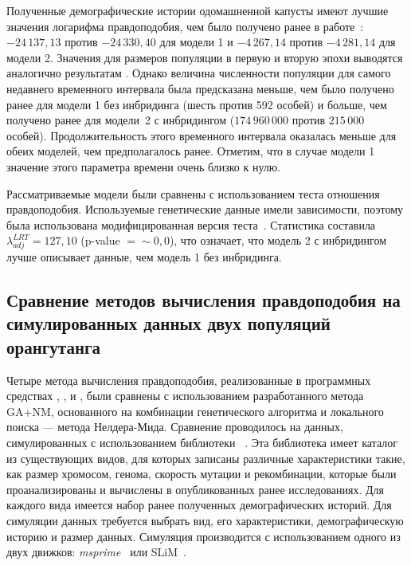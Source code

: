 Полученные демографические истории одомашненной капусты имеют лучшие значения логарифма правдоподобия, чем было получено ранее в работе~\cite{blischak2020inferring}: $-24{\,}137{,}13$ против $-24{\,}330{,}40$ для модели 1 и $-4{\,}267{,}14$ против $-4{\,}281{,}14$ для модели 2.
Значения для размеров популяции в первую и вторую эпохи выводятся аналогично результатам \cite{blischak2020inferring}.
Однако величина численности популяции для самого недавнего временного интервала была предсказана меньше, чем было получено ранее для модели 1 без инбридинга (шесть против 592 особей) и больше, чем получено ранее для модели~2 с инбридингом ($174{\,}960{\,}000$ против $215{\,}000$ особей).
Продолжительность этого временного интервала оказалась меньше для обеих моделей, чем предполагалось ранее.
Отметим, что в случае модели 1 значение этого параметра времени очень близко к нулю.

Рассматриваемые модели были сравнены с использованием теста отношения правдоподобия.
Используемые генетические данные имели зависимости, поэтому была использована модифицированная версия теста~\cite{coffman2016computationally}.
Статистика составила $\lambda_{adj}^{LRT} = 127{,}10$ (p-value $={\sim}0{,}0$), что означает, что модель 2 с инбридингом лучше описывает данные, чем модель 1 без инбридинга.


\subsection{Сравнение методов вычисления правдоподобия на симулированных данных двух популяций орангутанга}
\label{sec:part2:ga_experiments:orangutan}

Четыре метода вычисления правдоподобия, реализованные в программных средствах \dadi, \moments, \momi и \momentsLD, были сравнены с использованием разработанного метода GA+NM, основанного на комбинации генетического алгоритма и локального поиска --- метода Нелдера-Мида.
Сравнение проводилось на данных, симулированных с использованием библиотеки \stdpopsim~\cite{adrion2020community, lauterbur2023expanding}.
Эта библиотека имеет каталог из существующих видов, для которых записаны различные характеристики такие, как размер хромосом, генома, скорость мутации и рекомбинации, которые были проанализированы и вычислены в опубликованных ранее исследованиях.
Для каждого вида имеется набор ранее полученных демографических историй.
Для симуляции данных требуется выбрать вид, его характеристики, демографическую историю и размер данных.
Симуляция производится с использованием одного из двух движков: \textit{msprime}~\cite{kelleher2016efficient} или SLiM~\cite{haller2019slim}.

